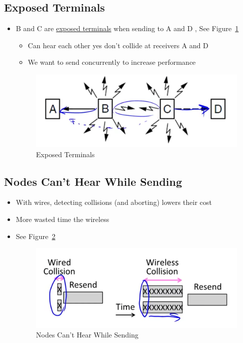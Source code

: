 \documentclass[12pt]{ctexart}   %
\begin{document}
	\subsection{Exposed Terminals}
	\begin{itemize}
		\item B and C are \underline{exposed terminals} when sending to A and D   , See Figure~\ref{fig:3-6-3}
		\begin{itemize}
			\item Can hear each other yes don't collide at receivers A and D
			\item We want to send concurrently to increase performance
		\end{itemize}
		
		\begin{figure}[h!] %
		\centering
		 \includegraphics[scale=0.7]{images/3-6-3}
		\caption{ Exposed Terminals }
		 \label{fig:3-6-3}
		 \end{figure}
	\end{itemize}
	
	\subsection{Nodes Can't Hear While Sending}
	\begin{itemize}
		\item With wires, detecting collisions (and aborting) lowers their cost
		\item More wasted time the wireless
		\item See Figure~\ref{fig:3-6-4}
		
		\begin{figure}[h!] %
		\centering
		 \includegraphics[scale=0.7]{images/3-6-4}
		\caption{ Nodes Can't Hear While Sending }
		 \label{fig:3-6-4}
		 \end{figure}
	\end{itemize}
	
\end{document}
